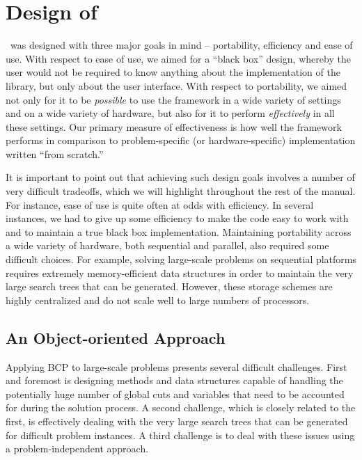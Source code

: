 \section{Design of \BB}
\label{design}

\BB\ was designed with three major goals in mind -- portability, 
efficiency and
ease of use. With respect to ease of use, we aimed for a ``black box''
design, whereby the user would not be required to know anything about
the implementation of the library, but only about the user interface.
With respect to portability, we aimed not only for it to be {\em
possible} to use the framework in a wide variety of settings and on a
wide variety of hardware, but also for it to perform {\em effectively} in all
these settings. Our primary measure of effectiveness is
how well the framework performs in comparison to problem-specific
(or hardware-specific) implementation written ``from scratch.''

It is important to point out that achieving such design goals involves
a number of very difficult tradeoffs, which we will highlight
throughout the rest of the manual. For instance, ease of use is quite
often at odds with efficiency. In several instances, we had to give up
some efficiency to make the code easy to work with and to maintain a
true black box implementation. Maintaining portability across a wide
variety of hardware, both sequential and parallel, also required some
difficult choices. For example, solving large-scale problems on
sequential platforms requires extremely memory-efficient data
structures in order to maintain the very large search trees that can
be generated. However, these storage schemes are highly centralized
and do not scale well to large numbers of processors. 

\subsection{An Object-oriented Approach}
\label{object-oriented}

Applying BCP to large-scale problems
presents several difficult challenges. First and foremost is designing
methods and data structures capable of handling the potentially huge
number of global cuts and variables that need to be accounted for
during the solution process. A second challenge, which is closely
related to the first, is effectively dealing with the very large
search trees that can be generated for difficult problem instances. A
third challenge is to deal with these issues using a
problem-independent approach. 

